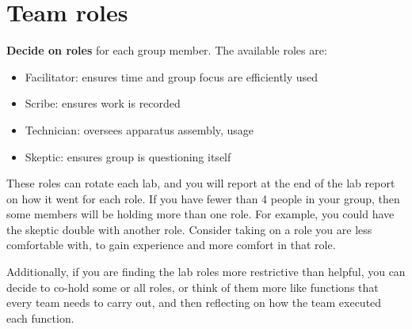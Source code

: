 \section{Team roles}

\textbf{Decide on roles} for each group member. The available roles are:

\begin{itemize}
	\item Facilitator: ensures time and group focus are efficiently used
	\item Scribe: ensures work is recorded
	\item Technician: oversees apparatus assembly, usage
	\item Skeptic: ensures group is questioning itself
\end{itemize}

These roles can rotate each lab, and you will report at the end of the lab report on how it went for each role. If you have fewer than 4 people in your group, then some members will be holding more than one role. For example, you could have the skeptic double with another role. Consider taking on a role you are less comfortable with, to gain experience and more comfort in that role.

Additionally, if you are finding the lab roles more restrictive than helpful, you can decide to co-hold some or all roles, or think of them more like functions that every team needs to carry out, and then reflecting on how the team executed each function.

%
%


